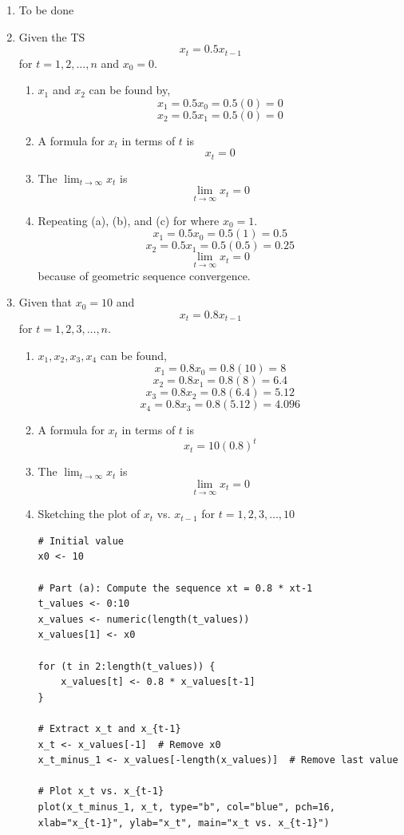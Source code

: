 \documentclass[12pt]{article}
\begin{document}
\begin{enumerate}
    \item To be done
    
    \item Given the TS
    \[ x_t = 0.5x_{t-1} \]
    for $t = 1,2, \ldots, n$ and $x_0 = 0$.

    \begin{enumerate}
        \item $x_1$ and $x_2$ can be found by,
        \[ x_1 = 0.5x_0 = 0.5(0) = 0 \]
        \[ x_2 = 0.5x_1 = 0.5(0) = 0 \]
        \item A formula for $x_t$ in terms of $t$ is
        \[ x_t = 0 \]
        \item The $\lim_{t \to \infty} x_t$ is
        \[ \lim_{t \to \infty} x_t = 0 \]
        \item Repeating (a), (b), and (c) for where $x_0 = 1$.
        \[ x_1 = 0.5x_0 = 0.5(1) = 0.5 \]
        \[ x_2 = 0.5x_1 = 0.5(0.5) = 0.25 \]
        \[ \lim_{t \to \infty} x_t = 0 \]
        because of geometric sequence convergence.
    \end{enumerate}

    \item Given that $x_0 = 10$ and 
    \[ x_t = 0.8x_{t-1} \] for $t = 1, 2, 3, \ldots, n$.

    \begin{enumerate}
        \item $x_1, x_2, x_3, x_4$ can be found,
        \[ x_1 = 0.8x_0 = 0.8(10) = 8 \]
        \[ x_2 = 0.8x_1 = 0.8(8) = 6.4 \]
        \[ x_3 = 0.8x_2 = 0.8(6.4) = 5.12 \]
        \[ x_4 = 0.8x_3 = 0.8(5.12) = 4.096 \]
        \item A formula for $x_t$ in terms of $t$ is
        \[ x_t = 10(0.8)^t \]
        \item The $\lim_{t \to \infty} x_t$ is
        \[ \lim_{t \to \infty} x_t = 0 \]
        \item Sketching the plot of $x_t$ vs. 
        $x_{t-1}$ for $t = 1, 2, 3, \ldots, 10$
        \begin{verbatim}
# Initial value
x0 <- 10

# Part (a): Compute the sequence xt = 0.8 * xt-1
t_values <- 0:10
x_values <- numeric(length(t_values))
x_values[1] <- x0

for (t in 2:length(t_values)) {
    x_values[t] <- 0.8 * x_values[t-1]
}

# Extract x_t and x_{t-1}
x_t <- x_values[-1]  # Remove x0
x_t_minus_1 <- x_values[-length(x_values)]  # Remove last value

# Plot x_t vs. x_{t-1}
plot(x_t_minus_1, x_t, type="b", col="blue", pch=16, 
xlab="x_{t-1}", ylab="x_t", main="x_t vs. x_{t-1}")


\end{verbatim}
\end{enumerate}
\end{enumerate}
\end{document}
